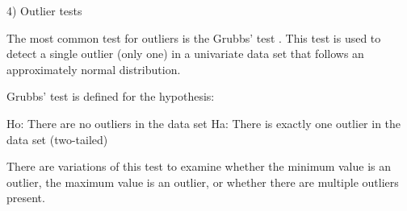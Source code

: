 4) Outlier tests
 
The most common test for outliers is the Grubbs' test . This test is used to detect a single outlier (only one) in a univariate data set that follows an approximately normal distribution.
 
Grubbs' test is defined for the  hypothesis:
 
 Ho:  There are no outliers in the data set          
 Ha:  There is exactly one outlier in the data set  (two-tailed)
 
There are variations of this test to examine whether the minimum value is an outlier, the maximum value is an outlier, or whether there are multiple outliers present.
 


